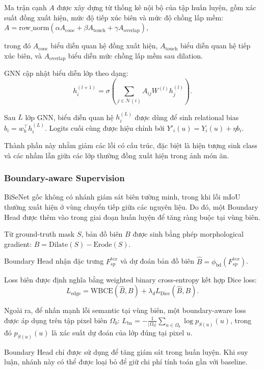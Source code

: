 Ma trận cạnh $A$ được xây dựng từ thống kê nội bộ của tập huấn luyện, gồm xác suất đồng xuất hiện, mức độ tiếp xúc biên và mức độ chồng lấp mềm: $A = \mathrm{row\_norm}\!\left(\alpha A_{\text{cooc}} + \beta A_{\text{touch}} + \gamma A_{\text{overlap}}\right)$,

trong đó $A_{\text{cooc}}$ biểu diễn quan hệ đồng xuất hiện, $A_{\text{touch}}$ biểu diễn quan hệ tiếp xúc biên, và $A_{\text{overlap}}$ biểu diễn mức chồng lấp mềm sau dilation.

GNN cập nhật biểu diễn lớp theo dạng:
\[
h_i^{(l+1)} = \sigma\!\left(\sum_{j \in \mathcal{N}(i)} A_{ij} W^{(l)} h_j^{(l)}\right).
\]

Sau $L$ lớp GNN, biểu diễn quan hệ $h_i^{(L)}$ được dùng để sinh relational bias $b_i = w_b^\top h_i^{(L)}$. Logits cuối cùng được hiệu chỉnh bởi $Y'_i(u) = Y_i(u) + \eta b_i$.

Thành phần này nhằm giảm các lỗi có cấu trúc, đặc biệt là hiện tượng sink class và các nhầm lẫn giữa các lớp thường đồng xuất hiện trong ảnh món ăn.

\subsubsection{Boundary-aware Supervision}

BiSeNet gốc không có nhánh giám sát biên tường minh, trong khi lỗi mIoU thường xuất hiện ở vùng chuyển tiếp giữa các nguyên liệu. Do đó, một Boundary Head được thêm vào trong giai đoạn huấn luyện để tăng ràng buộc tại vùng biên.

Từ ground-truth mask $S$, bản đồ biên $B$ được sinh bằng phép morphological gradient: $B = \mathrm{Dilate}(S) - \mathrm{Erode}(S)$.

Boundary Head nhận đặc trưng $F_{sp}^{tex}$ và dự đoán bản đồ biên $\hat{B} = \phi_{\text{bd}}(F_{sp}^{tex})$.

Loss biên được định nghĩa bằng weighted binary cross-entropy kết hợp Dice loss: 
\[
L_{\text{edge}}
=
\mathrm{WBCE}(\hat{B}, B)
+
\lambda_d L_{\text{Dice}}(\hat{B}, B).
\]

Ngoài ra, để nhấn mạnh lỗi semantic tại vùng biên, một boundary-aware loss được áp dụng trên tập pixel biên $\Omega_b$: $L_{\text{ba}} = -\frac{1}{|\Omega_b|}\sum_{u \in \Omega_b}\log p_{S(u)}(u)$, trong đó $p_{S(u)}(u)$ là xác suất dự đoán của lớp đúng tại pixel $u$.

Boundary Head chỉ được sử dụng để tăng giám sát trong huấn luyện. Khi suy luận, nhánh này có thể được loại bỏ để giữ chi phí tính toán gần với baseline.

